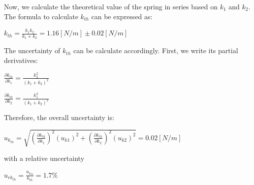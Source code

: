 \documentclass[a4paper,12pt]{article}
\begin{document}
\begin{appendices}
\par Now, we calculate the theoretical value of the spring in series based on $k_1$ and $k_2$. The formula to calculate $k_{th}$ can be expressed as:
\begin{center}
$\displaystyle k_{th} = \frac{k_1k_2}{k_1+k_2} = 1.16 [N/m] \pm 0.02 [N/m]$
\end{center}
\par The uncertainty of $k_{th}$ can be calculate accordingly. First, we write its partial derivatives:
\begin{center}
$ \displaystyle \frac{\partial k_{th}}{\partial k_1} = \frac{k_2^2}{(k_1+k_2)^2} $
\end{center}
\begin{center}
$ \displaystyle \frac{\partial k_{th}}{\partial k_2} = \frac{k_1^2}{(k_1+k_2)^2} $
\end{center}
\par Therefore, the overall uncertainty is:
\begin{center}
$ \displaystyle u_{k_{th}} = \sqrt{(\frac{\partial k_{th}}{\partial k_1})^2(u_{k1})^2 + (\frac{\partial k_{th}}{\partial k_2})^2(u_{k2})^2} = 0.02[N/m]$
\end{center}
with a relative uncertainty 
\begin{center}
$\displaystyle u_{rk_{th}} = \frac{u_{k_{th}}}{k_{th}} = 1.7\%$
\end{center}

\end{appendices}
\end{document}

